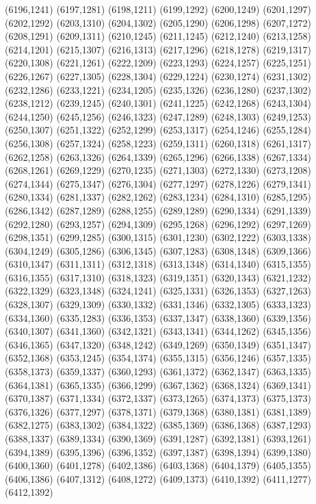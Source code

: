 (6196,1241)
(6197,1281)
(6198,1211)
(6199,1292)
(6200,1249)
(6201,1297)
(6202,1292)
(6203,1310)
(6204,1302)
(6205,1290)
(6206,1298)
(6207,1272)
(6208,1291)
(6209,1311)
(6210,1245)
(6211,1245)
(6212,1240)
(6213,1258)
(6214,1201)
(6215,1307)
(6216,1313)
(6217,1296)
(6218,1278)
(6219,1317)
(6220,1308)
(6221,1261)
(6222,1209)
(6223,1293)
(6224,1257)
(6225,1251)
(6226,1267)
(6227,1305)
(6228,1304)
(6229,1224)
(6230,1274)
(6231,1302)
(6232,1286)
(6233,1221)
(6234,1205)
(6235,1326)
(6236,1280)
(6237,1302)
(6238,1212)
(6239,1245)
(6240,1301)
(6241,1225)
(6242,1268)
(6243,1304)
(6244,1250)
(6245,1256)
(6246,1323)
(6247,1289)
(6248,1303)
(6249,1253)
(6250,1307)
(6251,1322)
(6252,1299)
(6253,1317)
(6254,1246)
(6255,1284)
(6256,1308)
(6257,1324)
(6258,1223)
(6259,1311)
(6260,1318)
(6261,1317)
(6262,1258)
(6263,1326)
(6264,1339)
(6265,1296)
(6266,1338)
(6267,1334)
(6268,1261)
(6269,1229)
(6270,1235)
(6271,1303)
(6272,1330)
(6273,1208)
(6274,1344)
(6275,1347)
(6276,1304)
(6277,1297)
(6278,1226)
(6279,1341)
(6280,1334)
(6281,1337)
(6282,1262)
(6283,1234)
(6284,1310)
(6285,1295)
(6286,1342)
(6287,1289)
(6288,1255)
(6289,1289)
(6290,1334)
(6291,1339)
(6292,1280)
(6293,1257)
(6294,1309)
(6295,1268)
(6296,1292)
(6297,1269)
(6298,1351)
(6299,1285)
(6300,1315)
(6301,1230)
(6302,1222)
(6303,1338)
(6304,1249)
(6305,1286)
(6306,1345)
(6307,1283)
(6308,1348)
(6309,1366)
(6310,1347)
(6311,1311)
(6312,1318)
(6313,1348)
(6314,1340)
(6315,1355)
(6316,1355)
(6317,1310)
(6318,1323)
(6319,1351)
(6320,1343)
(6321,1232)
(6322,1329)
(6323,1348)
(6324,1241)
(6325,1331)
(6326,1353)
(6327,1263)
(6328,1307)
(6329,1309)
(6330,1332)
(6331,1346)
(6332,1305)
(6333,1323)
(6334,1360)
(6335,1283)
(6336,1353)
(6337,1347)
(6338,1360)
(6339,1356)
(6340,1307)
(6341,1360)
(6342,1321)
(6343,1341)
(6344,1262)
(6345,1356)
(6346,1365)
(6347,1320)
(6348,1242)
(6349,1269)
(6350,1349)
(6351,1347)
(6352,1368)
(6353,1245)
(6354,1374)
(6355,1315)
(6356,1246)
(6357,1335)
(6358,1373)
(6359,1337)
(6360,1293)
(6361,1372)
(6362,1347)
(6363,1335)
(6364,1381)
(6365,1335)
(6366,1299)
(6367,1362)
(6368,1324)
(6369,1341)
(6370,1387)
(6371,1334)
(6372,1337)
(6373,1265)
(6374,1373)
(6375,1373)
(6376,1326)
(6377,1297)
(6378,1371)
(6379,1368)
(6380,1381)
(6381,1389)
(6382,1275)
(6383,1302)
(6384,1322)
(6385,1369)
(6386,1368)
(6387,1293)
(6388,1337)
(6389,1334)
(6390,1369)
(6391,1287)
(6392,1381)
(6393,1261)
(6394,1389)
(6395,1396)
(6396,1352)
(6397,1387)
(6398,1394)
(6399,1380)
(6400,1360)
(6401,1278)
(6402,1386)
(6403,1368)
(6404,1379)
(6405,1355)
(6406,1386)
(6407,1312)
(6408,1272)
(6409,1373)
(6410,1392)
(6411,1277)
(6412,1392)
